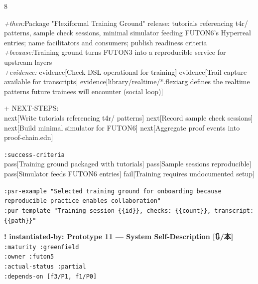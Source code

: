\documentclass[landscape]{article}
\newcommand{\flexitag}[1]{\textcolor[gray]{0.35}{\textit{#1}}}
\newenvironment{devmapgreenfield}{%
  \def\FrameCommand{\colorbox{devmapgreenfieldbg}}%
  \setlength{\fboxsep}{2pt}%
  \MakeFramed{\advance\hsize-\width \FrameRestore}%
}{\endMakeFramed}
\begin{document}
\begin{paracol}{8}
\begin{devmapgreenfield}
  \flexitag{+then:}Package "Flexiformal Training Ground" release: tutorials referencing t4r/ patterns, sample check sessions, minimal simulator feeding FUTON6’s Hyperreal entries; name facilitators and consumers; publish readiness criteria\\
  \flexitag{+because:}Training ground turns FUTON3 into a reproducible service for upstream layers\\
  \flexitag{+evidence:} evidence[Check DSL operational for training] evidence[Trail capture available for transcripts] evidence[library/realtime/*.flexiarg defines the realtime patterns future trainees will encounter (social loop)]\\
\par
  + NEXT-STEPS:\\
    next[Write tutorials referencing t4r/ patterns] next[Record sample check sessions] next[Build minimal simulator for FUTON6] next[Aggregate proof events into proof-chain.edn]\\
\par
  \texttt{:\allowbreak{}success-\allowbreak{}criteria}\\
    pass[Training ground packaged with tutorials] pass[Sample sessions reproducible] pass[Simulator feeds FUTON6 entries] fail[Training requires undocumented setup]\\
\par
  \texttt{:\allowbreak{}psr-\allowbreak{}example "Selected training ground for onboarding because reproducible practice enables collaboration"}\\
  \texttt{:\allowbreak{}pur-\allowbreak{}template "Training session \{\{id\}\},\allowbreak{} checks:\allowbreak{} \{\{count\}\},\allowbreak{} transcript:\allowbreak{} \{\{path\}\}"}\\
\par
\par
\end{devmapgreenfield}
\begin{devmapgreenfield}
\textbf{! instantiated-by: Prototype 11 — System Self-Description [🔃/本]}\\
  \texttt{:\allowbreak{}maturity :\allowbreak{}greenfield}\\
  \texttt{:\allowbreak{}owner :\allowbreak{}futon5}\\
  \texttt{:\allowbreak{}actual-\allowbreak{}status :\allowbreak{}partial}\\
  \texttt{:\allowbreak{}depends-\allowbreak{}on [f3/\allowbreak{}P1,\allowbreak{} f1/\allowbreak{}P0]}\\

\end{devmapgreenfield}
\end{paracol}
\end{document}
